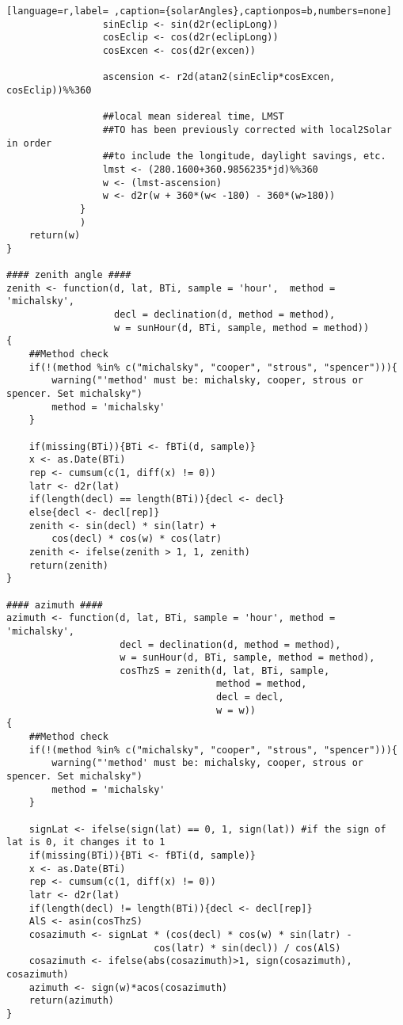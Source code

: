 \begin{lstlisting}[language=r,label= ,caption={solarAngles},captionpos=b,numbers=none]
                 sinEclip <- sin(d2r(eclipLong))
                 cosEclip <- cos(d2r(eclipLong))
                 cosExcen <- cos(d2r(excen))

                 ascension <- r2d(atan2(sinEclip*cosExcen, cosEclip))%%360

                 ##local mean sidereal time, LMST
                 ##TO has been previously corrected with local2Solar in order
                 ##to include the longitude, daylight savings, etc.
                 lmst <- (280.1600+360.9856235*jd)%%360
                 w <- (lmst-ascension)
                 w <- d2r(w + 360*(w< -180) - 360*(w>180))
             }
             )
    return(w)
}

#### zenith angle ####
zenith <- function(d, lat, BTi, sample = 'hour',  method = 'michalsky',
                   decl = declination(d, method = method),
                   w = sunHour(d, BTi, sample, method = method))
{
    ##Method check
    if(!(method %in% c("michalsky", "cooper", "strous", "spencer"))){
        warning("'method' must be: michalsky, cooper, strous or spencer. Set michalsky")
        method = 'michalsky'
    }

    if(missing(BTi)){BTi <- fBTi(d, sample)}
    x <- as.Date(BTi)
    rep <- cumsum(c(1, diff(x) != 0))
    latr <- d2r(lat)
    if(length(decl) == length(BTi)){decl <- decl}
    else{decl <- decl[rep]}
    zenith <- sin(decl) * sin(latr) +
        cos(decl) * cos(w) * cos(latr)
    zenith <- ifelse(zenith > 1, 1, zenith)
    return(zenith)
}

#### azimuth ####
azimuth <- function(d, lat, BTi, sample = 'hour', method = 'michalsky',
                    decl = declination(d, method = method),
                    w = sunHour(d, BTi, sample, method = method),
                    cosThzS = zenith(d, lat, BTi, sample,
                                     method = method,
                                     decl = decl,
                                     w = w))
{
    ##Method check
    if(!(method %in% c("michalsky", "cooper", "strous", "spencer"))){
        warning("'method' must be: michalsky, cooper, strous or spencer. Set michalsky")
        method = 'michalsky'
    }

    signLat <- ifelse(sign(lat) == 0, 1, sign(lat)) #if the sign of lat is 0, it changes it to 1
    if(missing(BTi)){BTi <- fBTi(d, sample)}
    x <- as.Date(BTi)
    rep <- cumsum(c(1, diff(x) != 0))
    latr <- d2r(lat)
    if(length(decl) != length(BTi)){decl <- decl[rep]}
    AlS <- asin(cosThzS)
    cosazimuth <- signLat * (cos(decl) * cos(w) * sin(latr) -
                          cos(latr) * sin(decl)) / cos(AlS)
    cosazimuth <- ifelse(abs(cosazimuth)>1, sign(cosazimuth), cosazimuth)
    azimuth <- sign(w)*acos(cosazimuth)
    return(azimuth)
}
\end{lstlisting}
